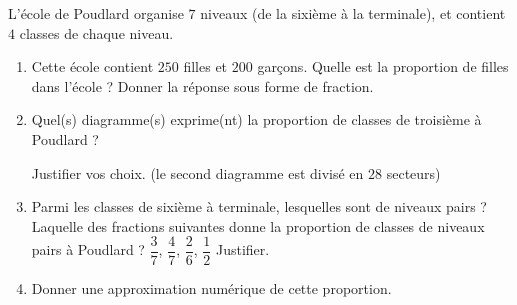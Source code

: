 
\begin{exercice}\label{exosmath-0888}

    L'école de Poudlard organise \( 7\) niveaux (de la sixième à la terminale), et contient \( 4\) classes de chaque niveau. 
    
    \begin{enumerate}
        \item
            Cette école contient \( 250\) filles et \( 200\) garçons. Quelle est la proportion de filles dans l'école ? Donner la réponse sous forme de fraction.
        \item
            
    Quel(s) diagramme(s) exprime(nt) la proportion de classes de troisième à Poudlard ?

\begin{center}
   
   
   
\end{center}
Justifier vos choix. (le second diagramme est divisé en \( 28\) secteurs)
\item
    Parmi les classes de sixième à terminale, lesquelles sont de niveaux pairs ? Laquelle des fractions suivantes donne la proportion de classes de niveaux pairs à Poudlard ?  \( \dfrac{ 3 }{ 7 }\), \( \dfrac{ 4 }{ 7 }\), \( \dfrac{ 2 }{ 6 }\), \( \dfrac{ 1 }{ 2 }\) Justifier.

\item
    Donner une approximation numérique de cette proportion.
    \end{enumerate}

\end{exercice}
